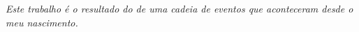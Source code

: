 \begin{dedicatoria}
   \vspace*{\fill}
   \centering
   \noindent
   \textit{Este trabalho é o resultado do de uma cadeia de eventos que aconteceram desde o meu nascimento.} \vspace*{\fill}
\end{dedicatoria}